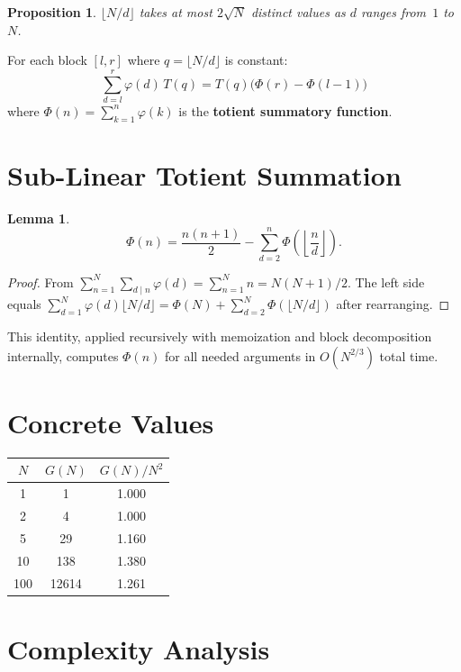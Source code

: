 \documentclass[11pt]{article}
\newtheorem{lemma}[theorem]{Lemma}
\newtheorem{proposition}[theorem]{Proposition}
\begin{document}
\begin{proposition}
$\lfloor N/d \rfloor$ takes at most $2\sqrt{N}$ distinct values as $d$ ranges from~$1$ to~$N$.
\end{proposition}

For each block $[l, r]$ where $q = \lfloor N/d \rfloor$ is constant:
\[
\sum_{d=l}^{r} \varphi(d)\,T(q) = T(q)\bigl(\Phi(r) - \Phi(l-1)\bigr)
\]
where $\Phi(n) = \sum_{k=1}^n \varphi(k)$ is the \textbf{totient summatory function}.

\section{Sub-Linear Totient Summation}

\begin{lemma}
\[
\Phi(n) = \frac{n(n+1)}{2} - \sum_{d=2}^{n} \Phi\!\left(\left\lfloor\frac{n}{d}\right\rfloor\right).
\]
\end{lemma}

\begin{proof}
From $\sum_{n=1}^N \sum_{d \mid n}\varphi(d) = \sum_{n=1}^N n = N(N+1)/2$. The left side equals $\sum_{d=1}^N \varphi(d)\lfloor N/d\rfloor = \Phi(N) + \sum_{d=2}^N \Phi(\lfloor N/d\rfloor)$ after rearranging.
\end{proof}

This identity, applied recursively with memoization and block decomposition internally, computes $\Phi(n)$ for all needed arguments in $O(N^{2/3})$ total time.

\section{Concrete Values}

\begin{center}
\begin{tabular}{ccc}
\toprule
$N$ & $G(N)$ & $G(N) / N^2$ \\
\midrule
1   & 1      & 1.000 \\
2   & 4      & 1.000 \\
5   & 29     & 1.160 \\
10  & 138    & 1.380 \\
100 & 12614  & 1.261 \\
\bottomrule
\end{tabular}
\end{center}

\section{Complexity Analysis}
\end{document}
